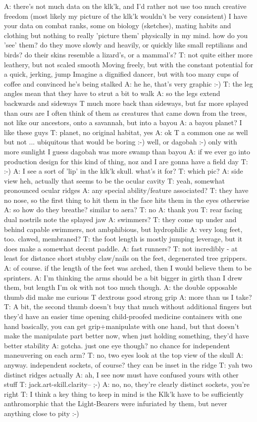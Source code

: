 A: there's not much data on the klk'k, and I'd rather not use too much creative freedom (most likely my picture of the klk'k wouldn't be very consistent)
I have your data on combat ranks, some on biology (sketches), mating habits and clothing
but nothing to really 'picture them' physically in my mind. how do you 'see' them?
 do they move slowly and heavily, or quickly like small reptilians and birds? do their skins resemble a lizard's, or a mammal's?
T: not quite either
more leathery, but not scaled
smooth
Moving freely, but with the constant potential for a quick, jerking, jump
Imagine a dignified dancer, but with too many cups of coffee and convinced he's being stalked
A: he he, that's very graphic :-)
T: the leg angles mean that they have to strut a bit to walk
A: so the legs extend backwards and sideways
T much more back than sideways, but far more splayed than ours are
I often think of them as creatures that came down from the trees, not like our ancestors, onto a savannah, but into a bayou
A: a bayou planet? I like these guys
T: planet, no
original habitat, yes
A: ok
T a common one as well
but not ... ubiquitous
that would be boring :-)
well, or dagobah :-)
only with more sunlight
I guess dagobah was more swamp than bayou
A: if we ever go into production design for this kind of thing, noz and I are gonna have a field day
T: :-)
A: I see a sort of 'lip' in the klk'k skull. what's it for?
T: which pic?
A: side view
heh, actually that seems to be the ocular cavity
T: yeah, somewhat pronounced ocular ridges
A: any special ability/feature associated?
T: they have no nose, so the first thing to hit them in the face hits them in the eyes otherwise
A: so how do they breathe? similar to aera?
T: no
A: thank you
T: rear facing dual nostrils
note the splayed jaw
A: swimmers?
T: they come up under and behind
capable swimmers, not ambphibious, but hydrophilic
A: very long feet, too. clawed, membraned?
T: the foot length is mostly jumping leverage, but it does make a somewhat decent paddle.
A: fast runners?
T: not incredibly - at least for distance
short stubby claw/nails on the feet, degenerated tree grippers.
A: of course. if the length of the feet was arched, then I would believe them to be sprinters.
A: I'm thinking the arms should be a bit bigger in girth than I drew them, but length I'm ok with
not too much though.
A: the double opposable thumb did make me curious
T dextrous
good strong grip
A: more than us I take?
T: A bit, the second thumb doesn't buy that much without additional fingers
but they'd have an easier time opening child-proofed medicine containers with one hand
basically, you can get grip+manipulate with one hand, but that doesn't make the manipulate part better
now, when just holding something, they'd have better stability
A: gotcha. just one eye though? no chance for independent maneuvering on each arm?
T: no, two eyes
look at the top view of the skull
A: anyway. independent sockets, of course? they can be inset in the ridge
T: yah
two distinct ridges actually
A: ah, I see now
must have confused yours with other stuff
T: jack.art-skill.clarity--
;-)
A: no, no, they're clearly distinct sockets, you're right
T: I think a key thing to keep in mind is the Klk'k have to be sufficiently anthromorphic that the Light-Bearers were infuriated by them, but never anything close to pity :-)

